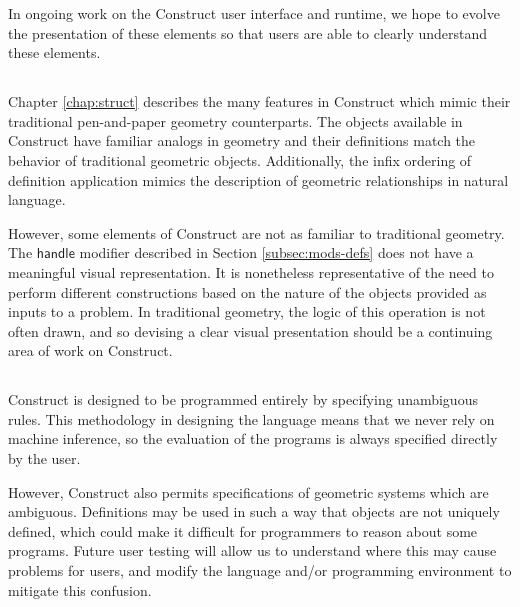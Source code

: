 \documentclass[twoside,openright,11pt]{report}
\begin{document}
In ongoing work on the Construct user interface and runtime, we hope to evolve the presentation of these elements so that users are able to clearly understand these elements.

\subsection{\constructgoalsnative}

Chapter \ref{chap:struct} describes the many features in Construct which mimic their traditional pen-and-paper geometry counterparts.
The objects available in Construct have familiar analogs in geometry and their definitions match the behavior of traditional geometric objects. 
Additionally, the infix ordering of definition application mimics the description of geometric relationships in natural language.

However, some elements of Construct are not as familiar to traditional geometry. 
The $\mathsf{handle}$ modifier described in Section \ref{subsec:mods-defs} does not have a meaningful visual representation.
It is nonetheless representative of the need to perform different constructions based on the nature of the objects provided as inputs to a problem. 
In traditional geometry, the logic of this operation is not often drawn, and so devising a clear visual presentation should be a continuing area of work on Construct.

\subsection{\constructgoalsnoinfer}

Construct is designed to be programmed entirely by specifying unambiguous rules.
This methodology in designing the language means that we never rely on machine inference, so the evaluation of the programs is always specified directly by the user.

However, Construct also permits specifications of geometric systems which are ambiguous. 
Definitions may be used in such a way that objects are not uniquely defined, which could make it difficult for programmers to reason about some programs. 
Future user testing will allow us to understand where this may cause problems for users, and modify the language and/or programming environment to mitigate this confusion.

\subsection{\constructgoalscomplete}
\end{document}
